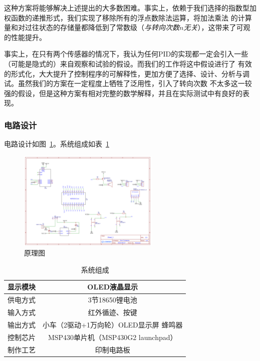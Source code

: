\documentclass[a4paper,twoside,zihao=5,UTF8]{ctexart}
\begin{document}
\begin{spacing}{1.2}
这种方案将能够解决上述提出的大多数困难。事实上，依赖于我们选择的指数型加权函数的递推形式，我们实现了移除所有的浮点数除法运算，将加法乘法
的计算量和对过往状态的存储量都降低到了常数级（\emph{与转向次数$n$无关}），这带来了可观的性能提升。

事实上，在只有两个传感器的情况下，我认为任何PID的实现都一定会引入一些（可能是隐式的）来自观察和试验的假设。而我们的工作将这中假设进行了
有效的形式化，大大提升了控制程序的可解释性，更加方便了选择、设计、分析与调试。虽然我们的方案在一定程度上牺牲了泛用性，引入了转向次数
不太多这一较强的假设，但是这种方案有相对完整的数学解释，并且在实际测试中有良好的表现。

\subsubsection{电路设计}

电路设计如图~\ref{fig:schematic2}。系统组成如表~\ref{tbl:system}

\begin{figure}[H]
	\centering
	\caption{原理图}
	\label{fig:schematic2}
	\includegraphics[width=0.6\textwidth]{Schematic.png}
\end{figure}

\begin{table}[H]
	\centering
	\renewcommand\arraystretch{1.5}
	\caption{系统组成}
	\label{tbl:system}
	\begin{tabular}{c|c}
		\toprule
		\hline
		显示模块 & OLED液晶显示 \\
		\hline
		供电方式 & 3节18650锂电池 \\
		\hline
		输入方式 & 红外循迹、按键 \\
		\hline
		输出方式 & 小车（2驱动+1万向轮）OLED显示屏 蜂鸣器 \\
		\hline
		控制芯片 & MSP430单片机（MSP430G2 launchpad） \\
		\hline
		制作工艺 & 印制电路板 \\
		\hline
		\bottomrule
	\end{tabular}
\end{table}



\end{spacing}
\end{document}
